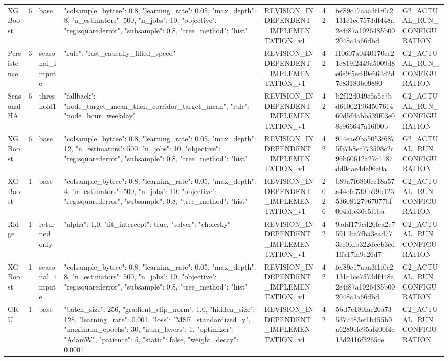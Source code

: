\begin{longtable}{llllllll}
XGBoost & 6 & base & {"colsample\_bytree": 0.8, "learning\_rate": 0.05, "max\_depth": 8, "n\_estimators": 500, "n\_jobs": 10, "objective": "reg:squarederror", "subsample": 0.8, "tree\_method": "hist"} & REVISION\_INDEPENDENT\_IMPLEMENTATION\_v1 & 42 & fef89c17aaa3f1f0c2131c1ce7573df448a2e4f87a1926485b002048c4a66dbd & G2\_ACTUAL\_RUN\_CONFIGURATION \\
Persistence & 3 & seasonal\_impute & {"rule": "last\_causally\_filled\_speed"} & REVISION\_INDEPENDENT\_IMPLEMENTATION\_v1 & 42 & f10607a0440170cc21c819f2449a5009d8e6e9f5ed49e664d2d7c83180b09880 & G2\_ACTUAL\_RUN\_CONFIGURATION \\
SeasonalHA & 6 & threshold1 & {"fallback": "node\_target\_mean\_then\_corridor\_target\_mean", "rule": "node\_hour\_weekday"} & REVISION\_INDEPENDENT\_IMPLEMENTATION\_v1 & 42 & b2f12d049e5a5c7bd61002196450761460d5fdabb539f03e08c966647a16f00b & G2\_ACTUAL\_RUN\_CONFIGURATION \\
XGBoost & 6 & base & {"colsample\_bytree": 0.8, "learning\_rate": 0.05, "max\_depth": 12, "n\_estimators": 500, "n\_jobs": 10, "objective": "reg:squarederror", "subsample": 0.8, "tree\_method": "hist"} & REVISION\_INDEPENDENT\_IMPLEMENTATION\_v1 & 42 & 914eae9ba5053f6875fa7b8ec773598c2c96b60612a27c1187dd0dae4de96a0a & G2\_ACTUAL\_RUN\_CONFIGURATION \\
XGBoost & 1 & base & {"colsample\_bytree": 0.8, "learning\_rate": 0.05, "max\_depth": 4, "n\_estimators": 500, "n\_jobs": 10, "objective": "reg:squarederror", "subsample": 0.8, "tree\_method": "hist"} & REVISION\_INDEPENDENT\_IMPLEMENTATION\_v1 & 2026 & b89a7f6860cc18a57a44efa730fb99b12353608127967077bf004abe36e5f1ba & G2\_ACTUAL\_RUN\_CONFIGURATION \\
Ridge & 1 & returned\_only & {"alpha": 1.0, "fit\_intercept": true, "solver": "cholesky"} & REVISION\_INDEPENDENT\_IMPLEMENTATION\_v1 & 42 & 9add179cd20fca2c75911ba7fba3ead773ec0fdb322dceb3cd1ffa17fa9e26d7 & G2\_ACTUAL\_RUN\_CONFIGURATION \\
XGBoost & 1 & seasonal\_impute & {"colsample\_bytree": 0.8, "learning\_rate": 0.05, "max\_depth": 8, "n\_estimators": 500, "n\_jobs": 10, "objective": "reg:squarederror", "subsample": 0.8, "tree\_method": "hist"} & REVISION\_INDEPENDENT\_IMPLEMENTATION\_v1 & 42 & fef89c17aaa3f1f0c2131c1ce7573df448a2e4f87a1926485b002048c4a66dbd & G2\_ACTUAL\_RUN\_CONFIGURATION \\
GRU & 1 & base & {"batch\_size": 256, "gradient\_clip\_norm": 1.0, "hidden\_size": 128, "learning\_rate": 0.001, "loss": "MSE\_standardized\_y", "maximum\_epochs": 30, "num\_layers": 1, "optimizer": "AdamW", "patience": 5, "static": false, "weight\_decay": 0.0001} & REVISION\_INDEPENDENT\_IMPLEMENTATION\_v1 & 42 & 5bd7c180fae20a735377483ef1b455b0a6289cfc95af400f4c13d2416f3265ce & G2\_ACTUAL\_RUN\_CONFIGURATION \\

\end{longtable}
